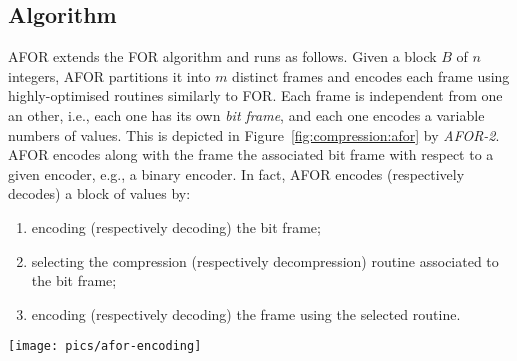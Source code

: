 \subsection{Algorithm}

AFOR extends the FOR algorithm and runs as follows. Given a block $B$ of $n$
integers, AFOR partitions it into $m$ distinct frames and encodes each frame
using highly-optimised routines similarly to FOR. Each frame is independent
from one an other, i.e., each one has its own \emph{bit frame}, and each one
encodes a variable numbers of values. This is depicted in
Figure~\ref{fig:compression:afor} by \emph{AFOR-2}. AFOR encodes along with
the frame the associated bit frame with respect to a given encoder, e.g., a
binary encoder. In fact, AFOR encodes (respectively decodes) a block of values
by:
\begin{enumerate}
\item encoding (respectively decoding) the bit frame;
\item selecting the compression (respectively decompression) routine associated
to the bit frame;
\item encoding (respectively decoding) the frame using the selected routine.
\end{enumerate}

\begin{figure*}
  \centering
	\texttt{[image: pics/afor-encoding]}
	\caption{Block compression comparison between FOR and AFOR. We alternate
	colours to differentiate independent frames. AFOR-1 denotes a first
	implementation of AFOR using a fixed frame length. AFOR-2 denotes a second
	implementation of AFOR using variable frame lengths. AFOR-3 denotes a third
	implementation using variable frame lengths and the frame stripping technique.
 	\emph{BFS} denotes the byte storing the bit frame selector associated to the
	next frame.}
	\label{fig:compression:afor}
\end{figure*}

